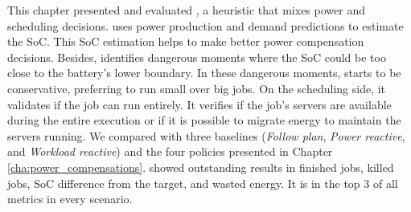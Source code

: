 This chapter presented and evaluated \emph{\systemName}, a heuristic that mixes power and scheduling decisions. \emph{\systemName} uses power production and demand predictions to estimate the SoC. This SoC estimation helps to make better power compensation decisions. Besides, \emph{\systemName} identifies dangerous moments where the SoC could be too close to the battery's lower boundary. In these dangerous moments, \emph{\systemName} starts to be conservative, preferring to run small over big jobs. On the scheduling side, it validates if the job can run entirely. It verifies if the job's servers are available during the entire execution or if it is possible to migrate energy to maintain the servers running. We compared \emph{\systemName} with three baselines (\emph{Follow plan}, \emph{Power reactive}, and \emph{Workload reactive}) and the four policies presented in Chapter \ref{cha:power_compensations}. \emph{\systemName} showed outstanding results in finished jobs, killed jobs, SoC difference from the target, and wasted energy. It is in the top 3 of all metrics in every scenario. 